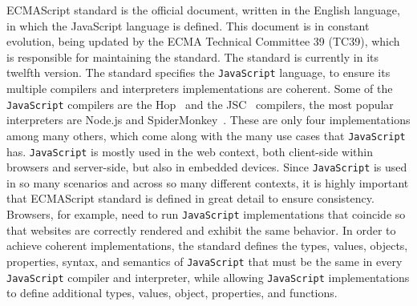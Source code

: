 \documentclass[runningheads]{llncs}
\begin{document}
ECMAScript standard is the official document, written in the English language, in which the JavaScript language is defined. This document is in constant evolution, being updated by the ECMA Technical Committee 39 (TC39), which is responsible for maintaining the standard. The standard is currently in its twelfth version.
%
The standard specifies the \texttt{JavaScript} language, to ensure its multiple compilers and interpreters implementations are coherent. Some of the \texttt{JavaScript} compilers are the Hop~\cite{Hop} and the JSC~\cite{JSC} compilers, the most popular interpreters are Node.js and SpiderMonkey~\cite{SpiderMonkey}. These are only four implementations among many others, which come along with the many use cases that \texttt{JavaScript} has.
%
\texttt{JavaScript} is mostly used in the web context, both client-side within browsers and server-side, but also in embedded devices. Since \texttt{JavaScript} is used in so many scenarios and across so many different contexts, it is highly important that ECMAScript standard is defined in great detail to ensure consistency. Browsers, for example, need to run \texttt{JavaScript} implementations that coincide so that websites are correctly rendered and exhibit the same behavior. In order to achieve coherent implementations, the standard defines the types, values, objects, properties, syntax, and semantics of \texttt{JavaScript} that must be the same in every \texttt{JavaScript} compiler and interpreter, while allowing \texttt{JavaScript} implementations to define additional types, values, object, properties, and functions.
\end{document}
